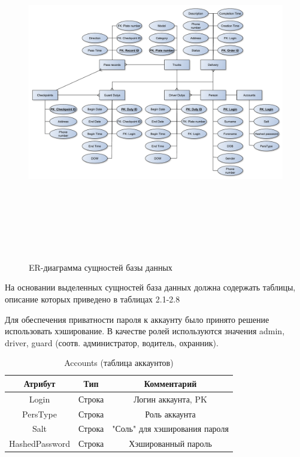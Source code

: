 \begin{figure}[ph!] \label{er_db}
	\begin{center}
		{\includegraphics[height=14cm, width = 14cm]{schemes/er_db.pdf}}
		\caption{ER-диаграмма сущностей базы данных}
	\end{center}
\end{figure}

На основании выделенных сущностей база данных должна содержать таблицы, описание которых приведено в таблицах 2.1-2.8

Для обеспечения приватности пароля к аккаунту было принято решение использовать хэширование. В качестве ролей используются значения admin, driver, guard (соотв. администратор, водитель, охранник).
\begin{table}[h] \label{acc_table}
	\begin{center}
	\caption{Accounts (таблица аккаунтов)}
	\begin{tabular}{| c | c | c |}
		\hline
		\textbf{Атрибут}		&	\textbf{Тип}		& \textbf{Комментарий} \\
		\hline
		Login 		&	Строка		&	Логин аккаунта, PK \\ \hline
		PersType 	&	Строка 		&	Роль аккаунта \\ \hline
		Salt 		&	Строка		&	"Соль" для хэширования пароля \\ \hline
		HashedPassword & Строка		&	Хэшированный пароль \\ \hline
	\end{tabular}
	\end{center}
\end{table}

